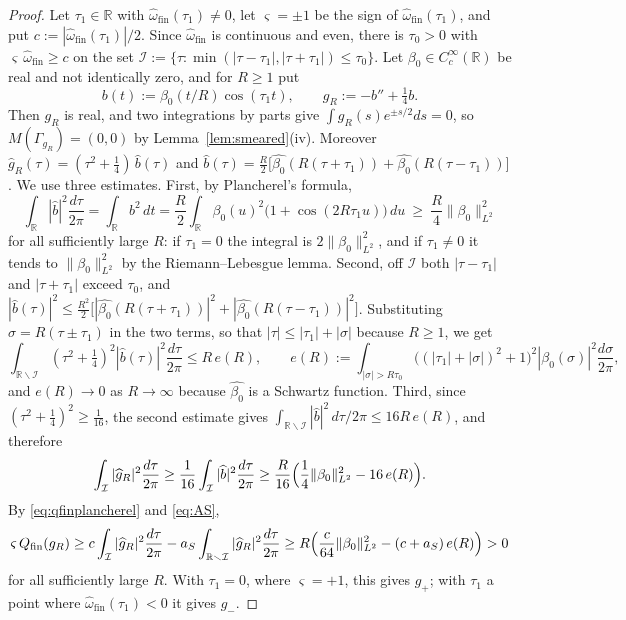 \documentclass[11pt]{amsart}
\theoremstyle{definition}
\newcommand{\R}{\mathbb R}
\begin{document}
\begin{proof}
Let $\tau_1\in\R$ with $\widehat\omega_{\mathrm{fin}}(\tau_1)\ne0$, let
$\varsigma=\pm1$ be the sign of $\widehat\omega_{\mathrm{fin}}(\tau_1)$, and put
$c:=|\widehat\omega_{\mathrm{fin}}(\tau_1)|/2$. Since
$\widehat\omega_{\mathrm{fin}}$ is continuous and even, there is $\tau_0>0$
with $\varsigma\,\widehat\omega_{\mathrm{fin}}\ge c$ on the set
$\mathcal I:=\{\tau:\min(|\tau-\tau_1|,|\tau+\tau_1|)\le\tau_0\}$. Let
$\beta_0\in C_c^\infty(\R)$ be real and not identically zero, and for $R\ge1$
put
\[
  b(t):=\beta_0(t/R)\cos(\tau_1t),\qquad g_R:=-b''+\tfrac14b .
\]
Then $g_R$ is real, and two integrations by parts give
$\int g_R(s)e^{\pm s/2}ds=0$, so $M(\Gamma_{g_R})=(0,0)$ by
Lemma~\ref{lem:smeared}(iv). Moreover
$\widehat g_R(\tau)=(\tau^2+\tfrac14)\,\widehat b(\tau)$ and
$\widehat b(\tau)=\tfrac R2\bigl[\widehat{\beta_0}(R(\tau+\tau_1))
+\widehat{\beta_0}(R(\tau-\tau_1))\bigr]$. We use three estimates. First, by
Plancherel's formula,
\[
  \int_\R|\widehat b|^2\frac{d\tau}{2\pi}=\int_\R b^2\,dt
   =\frac R2\int_\R\beta_0(u)^2\bigl(1+\cos(2R\tau_1u)\bigr)\,du
   \ \ge\ \frac R4\|\beta_0\|_{L^2}^2
\]
for all sufficiently large $R$: if $\tau_1=0$ the integral is
$2\|\beta_0\|_{L^2}^2$, and if $\tau_1\ne0$ it tends to $\|\beta_0\|_{L^2}^2$ by
the Riemann--Lebesgue lemma. Second, off $\mathcal I$ both $|\tau-\tau_1|$ and
$|\tau+\tau_1|$ exceed $\tau_0$, and
$|\widehat b(\tau)|^2\le\tfrac{R^2}2\bigl[|\widehat{\beta_0}(R(\tau+\tau_1))|^2
+|\widehat{\beta_0}(R(\tau-\tau_1))|^2\bigr]$. Substituting
$\sigma=R(\tau\pm\tau_1)$ in the two terms, so that
$|\tau|\le|\tau_1|+|\sigma|$ because $R\ge1$, we get
\[
  \int_{\R\smallsetminus \mathcal I}(\tau^2+\tfrac14)^2|\widehat b(\tau)|^2
    \frac{d\tau}{2\pi}\le R\,e(R),\qquad
  e(R):=\int_{|\sigma|>R\tau_0}\bigl((|\tau_1|+|\sigma|)^2+1\bigr)^2
    |\widehat{\beta_0}(\sigma)|^2\frac{d\sigma}{2\pi},
\]
and $e(R)\to0$ as $R\to\infty$ because $\widehat{\beta_0}$ is a Schwartz
function. Third, since $(\tau^2+\tfrac14)^2\ge\tfrac1{16}$, the second
estimate gives $\int_{\R\smallsetminus \mathcal I}|\widehat b|^2\,d\tau/2\pi
\le16R\,e(R)$, and therefore
\[
  \int_{\mathcal I}|\widehat g_R|^2\frac{d\tau}{2\pi}
   \ge\frac1{16}\int_{\mathcal I}|\widehat b|^2\frac{d\tau}{2\pi}
   \ge\frac R{16}\Bigl(\frac14\|\beta_0\|_{L^2}^2-16\,e(R)\Bigr).
\]
By \eqref{eq:qfinplancherel} and \eqref{eq:AS},
\[
  \varsigma\,Q_{\mathrm{fin}}(g_R)\ge c\int_{\mathcal I}|\widehat g_R|^2\frac{d\tau}{2\pi}
   -a_S\int_{\R\smallsetminus \mathcal I}|\widehat g_R|^2\frac{d\tau}{2\pi}
   \ge R\Bigl(\frac c{64}\|\beta_0\|_{L^2}^2-(c+a_S)\,e(R)\Bigr)>0
\]
for all sufficiently large $R$. With $\tau_1=0$, where $\varsigma=+1$, this
gives $g_+$; with $\tau_1$ a point where
$\widehat\omega_{\mathrm{fin}}(\tau_1)<0$ it gives $g_-$.
\end{proof}
\end{document}
